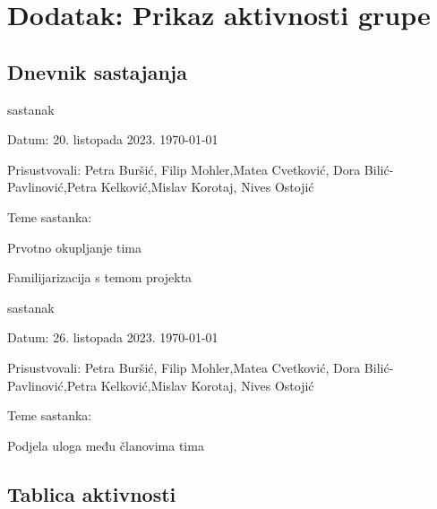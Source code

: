 \chapter*{Dodatak: Prikaz aktivnosti grupe}
		
		\section*{Dnevnik sastajanja}
		
		
		
		\begin{packed_enum}
			\item  sastanak
			
			\item[] \begin{packed_item}
				\item Datum: 20. listopada 2023. \today
				\item Prisustvovali: Petra Buršić, Filip Mohler,Matea Cvetković, Dora Bilić-Pavlinović,Petra Kelković,Mislav Korotaj, Nives Ostojić
				\item Teme sastanka:
				\begin{packed_item}
					\item  Prvotno okupljanje tima
					\item  Familijarizacija s temom projekta
				\end{packed_item}
			\end{packed_item}
			
			\item  sastanak
			\item[] \begin{packed_item}
				\item Datum: 26. listopada 2023. \today
				\item Prisustvovali: Petra Buršić, Filip Mohler,Matea Cvetković, Dora Bilić-Pavlinović,Petra Kelković,Mislav Korotaj, Nives Ostojić
				\item Teme sastanka:
				\begin{packed_item}
					\item  Podjela uloga među članovima tima
				\end{packed_item}
			\end{packed_item}
			
			
		\end{packed_enum}
		
		\eject
		\section*{Tablica aktivnosti}
		
